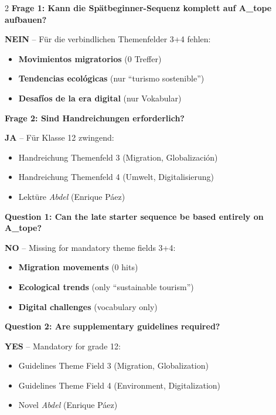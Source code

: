 \documentclass[10pt,a4paper]{article}
\begin{document}
\begin{paracol}{2}
\small
\textbf{Frage 1: Kann die Spätbeginner-Sequenz komplett auf A\_tope aufbauen?}

\textcolor{spanisch}{\textbf{NEIN}} -- Für die verbindlichen Themenfelder 3+4 fehlen:
\begin{itemize}[noitemsep,topsep=2pt]
\item \textbf{Movimientos migratorios} (0 Treffer)
\item \textbf{Tendencias ecológicas} (nur ``turismo sostenible'')
\item \textbf{Desafíos de la era digital} (nur Vokabular)
\end{itemize}

\textbf{Frage 2: Sind Handreichungen erforderlich?}

\textcolor{spanisch}{\textbf{JA}} -- Für Klasse 12 zwingend:
\begin{itemize}[noitemsep,topsep=2pt]
\item Handreichung Themenfeld 3 (Migration, Globalización)
\item Handreichung Themenfeld 4 (Umwelt, Digitalisierung)
\item Lektüre \textit{Abdel} (Enrique Páez)
\end{itemize}

\switchcolumn

\small\color{english}
\textbf{Question 1: Can the late starter sequence be based entirely on A\_tope?}

\textcolor{spanisch}{\textbf{NO}} -- Missing for mandatory theme fields 3+4:
\begin{itemize}[noitemsep,topsep=2pt]
\item \textbf{Migration movements} (0 hits)
\item \textbf{Ecological trends} (only ``sustainable tourism'')
\item \textbf{Digital challenges} (vocabulary only)
\end{itemize}

\textbf{Question 2: Are supplementary guidelines required?}

\textcolor{spanisch}{\textbf{YES}} -- Mandatory for grade 12:
\begin{itemize}[noitemsep,topsep=2pt]
\item Guidelines Theme Field 3 (Migration, Globalization)
\item Guidelines Theme Field 4 (Environment, Digitalization)
\item Novel \textit{Abdel} (Enrique Páez)
\end{itemize}

\end{paracol}
\end{document}
